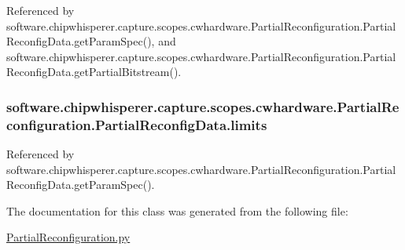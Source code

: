 Referenced by software.\+chipwhisperer.\+capture.\+scopes.\+cwhardware.\+Partial\+Reconfiguration.\+Partial\+Reconfig\+Data.\+get\+Param\+Spec(), and software.\+chipwhisperer.\+capture.\+scopes.\+cwhardware.\+Partial\+Reconfiguration.\+Partial\+Reconfig\+Data.\+get\+Partial\+Bitstream().

\hypertarget{classsoftware_1_1chipwhisperer_1_1capture_1_1scopes_1_1cwhardware_1_1PartialReconfiguration_1_1PartialReconfigData_ab20943776795324dc652953f6ea63212}{}
\subsubsection[{limits}]{\setlength{\rightskip}{0pt plus 5cm}software.\+chipwhisperer.\+capture.\+scopes.\+cwhardware.\+Partial\+Reconfiguration.\+Partial\+Reconfig\+Data.\+limits}\label{classsoftware_1_1chipwhisperer_1_1capture_1_1scopes_1_1cwhardware_1_1PartialReconfiguration_1_1PartialReconfigData_ab20943776795324dc652953f6ea63212}


Referenced by software.\+chipwhisperer.\+capture.\+scopes.\+cwhardware.\+Partial\+Reconfiguration.\+Partial\+Reconfig\+Data.\+get\+Param\+Spec().



The documentation for this class was generated from the following file\+:\begin{DoxyCompactItemize}
\item 
\hyperlink{PartialReconfiguration_8py}{Partial\+Reconfiguration.\+py}\end{DoxyCompactItemize}
